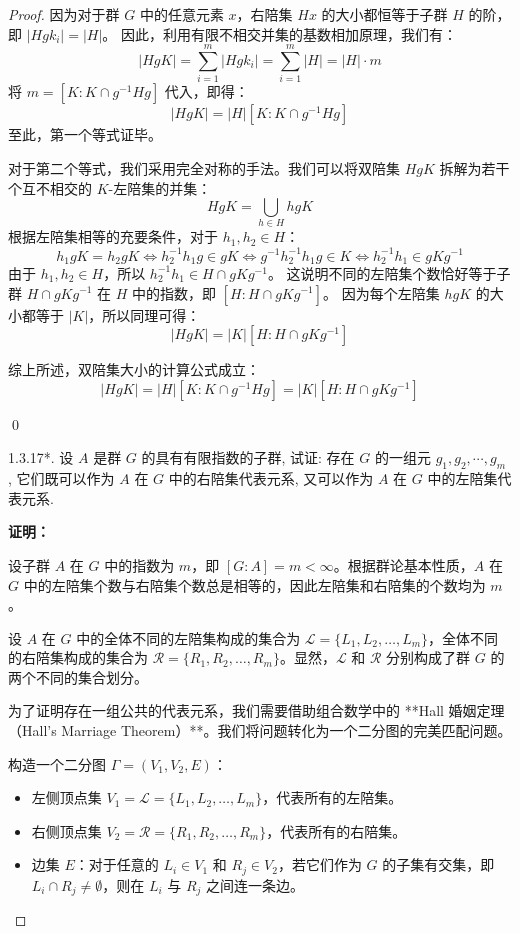 \documentclass[]{article}
\begin{document}
\begin{proof}
因为对于群 $G$ 中的任意元素 $x$，右陪集 $Hx$ 的大小都恒等于子群 $H$ 的阶，即 $|Hgk_i| = |H|$。
因此，利用有限不相交并集的基数相加原理，我们有：
\[ |HgK| = \sum_{i=1}^{m} |Hgk_i| = \sum_{i=1}^{m} |H| = |H| \cdot m \]
将 $m = [K : K \cap g^{-1}Hg]$ 代入，即得：
\[ |HgK| = |H| [K : K \cap g^{-1}Hg] \]
至此，第一个等式证毕。

\bigskip
对于第二个等式，我们采用完全对称的手法。我们可以将双陪集 $HgK$ 拆解为若干个互不相交的 $K$-左陪集的并集：
\[ HgK = \bigcup_{h \in H} hgK \]
根据左陪集相等的充要条件，对于 $h_1, h_2 \in H$：
\[ h_1gK = h_2gK \iff h_2^{-1}h_1g \in gK \iff g^{-1}h_2^{-1}h_1g \in K \iff h_2^{-1}h_1 \in gKg^{-1} \]
由于 $h_1, h_2 \in H$，所以 $h_2^{-1}h_1 \in H \cap gKg^{-1}$。
这说明不同的左陪集个数恰好等于子群 $H \cap gKg^{-1}$ 在 $H$ 中的指数，即 $[H : H \cap gKg^{-1}]$。
因为每个左陪集 $hgK$ 的大小都等于 $|K|$，所以同理可得：
\[ |HgK| = |K| [H : H \cap gKg^{-1}] \]

\bigskip
综上所述，双陪集大小的计算公式成立：
\[ | H g K | = | H | [ K: K \cap g ^ {- 1} H g ] = | K | [ H: H \cap g K g ^ {- 1} ] \]

\qed

1.3.17*. 设 $A$ 是群 $G$ 的具有有限指数的子群, 试证: 存在 $G$ 的一组元 $g_{1}, g_{2}, \cdots, g_{m}$ , 它们既可以作为 $A$ 在 $G$ 中的右陪集代表元系, 又可以作为 $A$ 在 $G$ 中的左陪集代表元系.

\bigskip
\noindent \textbf{证明：} 

设子群 $A$ 在 $G$ 中的指数为 $m$，即 $[G:A] = m < \infty$。根据群论基本性质，$A$ 在 $G$ 中的左陪集个数与右陪集个数总是相等的，因此左陪集和右陪集的个数均为 $m$。

设 $A$ 在 $G$ 中的全体不同的左陪集构成的集合为 $\mathcal{L} = \{L_1, L_2, \dots, L_m\}$，全体不同的右陪集构成的集合为 $\mathcal{R} = \{R_1, R_2, \dots, R_m\}$。显然，$\mathcal{L}$ 和 $\mathcal{R}$ 分别构成了群 $G$ 的两个不同的集合划分。

为了证明存在一组公共的代表元系，我们需要借助组合数学中的 **Hall 婚姻定理（Hall's Marriage Theorem）**。我们将问题转化为一个二分图的完美匹配问题。

\bigskip
构造一个二分图 $\Gamma = (V_1, V_2, E)$：
\begin{itemize}
	\item 左侧顶点集 $V_1 = \mathcal{L} = \{L_1, L_2, \dots, L_m\}$，代表所有的左陪集。
	\item 右侧顶点集 $V_2 = \mathcal{R} = \{R_1, R_2, \dots, R_m\}$，代表所有的右陪集。
	\item 边集 $E$：对于任意的 $L_i \in V_1$ 和 $R_j \in V_2$，若它们作为 $G$ 的子集有交集，即 $L_i \cap R_j \neq \emptyset$，则在 $L_i$ 与 $R_j$ 之间连一条边。
\end{itemize}


\end{proof}
\end{document}

